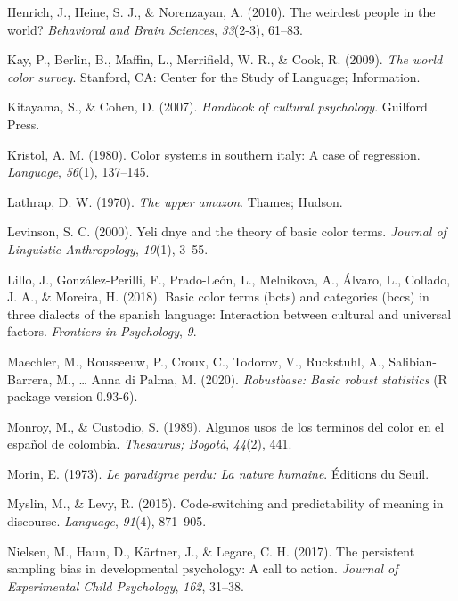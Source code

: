 \documentclass[
  english,
  ,man,floatsintext]{apa6}
\begin{document}
\leavevmode\hypertarget{ref-henrich2010}{}%
Henrich, J., Heine, S. J., \& Norenzayan, A. (2010). The weirdest people in the world? \emph{Behavioral and Brain Sciences}, \emph{33}(2-3), 61--83.

\leavevmode\hypertarget{ref-berlin2009}{}%
Kay, P., Berlin, B., Maffin, L., Merrifield, W. R., \& Cook, R. (2009). \emph{The world color survey}. Stanford, CA: Center for the Study of Language; Information.

\leavevmode\hypertarget{ref-kitayama2007}{}%
Kitayama, S., \& Cohen, D. (2007). \emph{Handbook of cultural psychology}. Guilford Press.

\leavevmode\hypertarget{ref-kristol1980}{}%
Kristol, A. M. (1980). Color systems in southern italy: A case of regression. \emph{Language}, \emph{56}(1), 137--145.

\leavevmode\hypertarget{ref-lathrap1970}{}%
Lathrap, D. W. (1970). \emph{The upper amazon}. Thames; Hudson.

\leavevmode\hypertarget{ref-levinson2000}{}%
Levinson, S. C. (2000). Yeli dnye and the theory of basic color terms. \emph{Journal of Linguistic Anthropology}, \emph{10}(1), 3--55.

\leavevmode\hypertarget{ref-lillo2018}{}%
Lillo, J., González-Perilli, F., Prado-León, L., Melnikova, A., Álvaro, L., Collado, J. A., \& Moreira, H. (2018). Basic color terms (bcts) and categories (bccs) in three dialects of the spanish language: Interaction between cultural and universal factors. \emph{Frontiers in Psychology}, \emph{9}.

\leavevmode\hypertarget{ref-R-robustbase}{}%
Maechler, M., Rousseeuw, P., Croux, C., Todorov, V., Ruckstuhl, A., Salibian-Barrera, M., \ldots{} Anna di Palma, M. (2020). \emph{Robustbase: Basic robust statistics} (R package version 0.93-6).

\leavevmode\hypertarget{ref-monroy1989}{}%
Monroy, M., \& Custodio, S. (1989). Algunos usos de los terminos del color en el español de colombia. \emph{Thesaurus; Bogotà}, \emph{44}(2), 441.

\leavevmode\hypertarget{ref-morin1973}{}%
Morin, E. (1973). \emph{Le paradigme perdu: La nature humaine}. Éditions du Seuil.

\leavevmode\hypertarget{ref-myslin2015}{}%
Myslin, M., \& Levy, R. (2015). Code-switching and predictability of meaning in discourse. \emph{Language}, \emph{91}(4), 871--905.

\leavevmode\hypertarget{ref-nielson2017}{}%
Nielsen, M., Haun, D., Kärtner, J., \& Legare, C. H. (2017). The persistent sampling bias in developmental psychology: A call to action. \emph{Journal of Experimental Child Psychology}, \emph{162}, 31--38.
\end{document}
